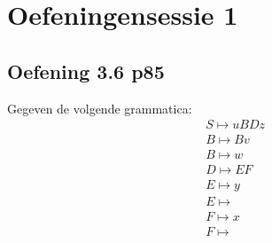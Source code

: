\chapter{Oefeningensessie 1}

\section{Oefening 3.6 p85}
Gegeven de volgende grammatica:
\begin{equation*}
	\begin{split}
	& S \mapsto uBDz \\
	& B \mapsto Bv \\
	& B \mapsto w \\
	& D \mapsto EF \\
	& E \mapsto y \\
	& E \mapsto \\
	& F \mapsto x \\
	& F \mapsto 
	\end{split}
\end{equation*}
